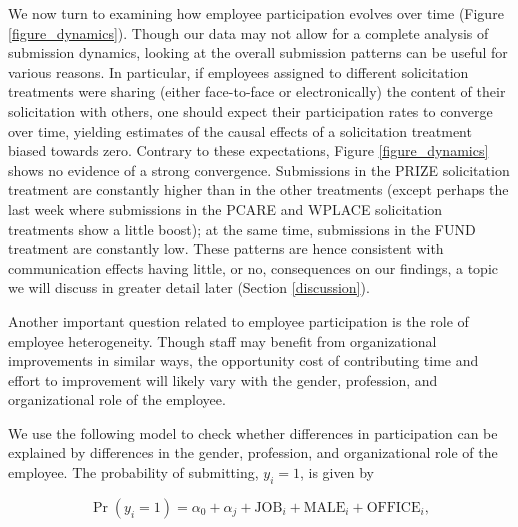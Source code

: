 \documentclass[11pt, titlepage]{article}
\begin{document}
We now turn to examining how employee participation evolves over time
(Figure \ref{figure_dynamics}). Though our data may not allow for a
complete analysis of submission dynamics, looking at the overall
submission patterns can be useful for various reasons. In particular, if
employees assigned to different solicitation treatments were sharing
(either face-to-face or electronically) the content of their
solicitation with others, one should expect their participation rates to
converge over time, yielding estimates of the causal effects of a
solicitation treatment biased towards zero. Contrary to these
expectations, Figure \ref{figure_dynamics} shows no evidence of a strong
convergence. Submissions in the PRIZE solicitation treatment are
constantly higher than in the other treatments (except perhaps the last
week where submissions in the PCARE and WPLACE solicitation treatments
show a little boost); at the same time, submissions in the FUND
treatment are constantly low. These patterns are hence consistent with
communication effects having little, or no, consequences on our
findings, a topic we will discuss in greater detail later (Section
\ref{discussion}).

Another important question related to employee participation is the role
of employee heterogeneity. Though staff may benefit from organizational
improvements in similar ways, the opportunity cost of contributing time
and effort to improvement will likely vary with the gender, profession,
and organizational role of the employee.

We use the following model to check whether differences in participation
can be explained by differences in the gender, profession, and
organizational role of the employee. The probability of submitting,
\(y_i=1\), is given by

\begin{equation} 
  \label{eq: submit}
    \Pr(y_i=1) = \alpha_0 + \alpha_{j} 
                                    + \text{JOB}_{i} 
                                    + \text{MALE}_{i} 
                                    + \text{OFFICE}_{i}, 
\end{equation}
\end{document}
